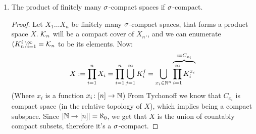 \documentclass[a4paper]{article}
\begin{document}
\begin{enumerate}
\begin{proof}
		\end{proof}
		\item The product of finitely many $\sigma$-compact spaces if $\sigma$-compact. \begin{proof}
			Let $X_1 \dots X_n$ be finitely many $\sigma$-compact spaces, that forms a product space $X$. $\mathcal{K}_n$ will be a compact cover of $X_n$., and we can enumerate $(K_n^{i})_{i = 1}^{\infty} = \mathcal{K}_n$ to be its elements. 
			Now:
			\[ X := \prod^{n}_{i = 1} X_i = \prod_{i = 1}^{n}\bigcup_{j = 1}^{\infty} K_i^{j} = \bigcup_{x_i \in \mathbb{N}^{n}}{\overbrace{\prod_{i = 1}^{\infty}K_i^{x_i}}^{:= C_{x_i}}} \]
			(Where $x_i$ is a function $x_i \colon [n] \to \mathbb{N}$) From Tychonoff we know that $C_{x_i}$ is compact space (in the relative topology of $X$), which implies being a compact subspace. Since $\left \lvert \mathbb{N} \to [n] \right \rvert = \aleph_0$, we get that $X$ is the union of countably compact subsets, therefore it's a $\sigma$-compact. 
		\end{proof}
	\end{enumerate}
	
\end{document}
